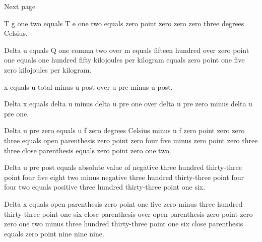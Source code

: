 Next page

T g one two equals T e one two equals zero point zero zero zero three degrees Celsius.

Delta u equals Q one comma two over m equals fifteen hundred over zero point one equals one hundred fifty kilojoules per kilogram equals zero point one five zero kilojoules per kilogram.

x equals u total minus u post over u pre minus u post.

Delta x equals delta u minus delta u pre one over delta u pre zero minus delta u pre one.

Delta u pre zero equals u f zero degrees Celsius minus u f zero point zero zero three equals open parenthesis zero point zero four five minus zero point zero three three close parenthesis equals zero point zero one two.

Delta u pre post equals absolute value of negative three hundred thirty-three point four five eight two minus negative three hundred thirty-three point four four two equals positive three hundred thirty-three point one six.

Delta x equals open parenthesis zero point one five zero minus three hundred thirty-three point one six close parenthesis over open parenthesis zero point zero zero one two minus three hundred thirty-three point one six close parenthesis equals zero point nine nine nine.